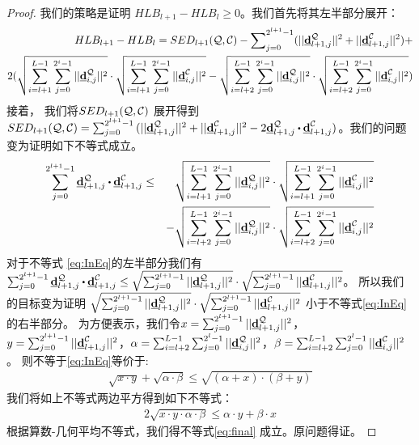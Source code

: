 \begin{proof}\label{proof:p2}
	我们的策略是证明 $HLB_{l+1}- HLB_{l}\ge 0$。我们首先将其左半部分展开：
	\begin{eqnarray}\label{eq:minus}
HLB_{l+1}- HLB_{l}= SED_{l+1}({\cal Q},{\cal C}) - \sum\nolimits_{j=0}^{2^{l+1}-1}(||\emph{{\textbf{d}}}_{l+1,j}^{\cal Q}||^2  + ||\emph{{\textbf{d}}}_{l+1,j}^{\cal C}||^2)+\nonumber\\
 2(\sqrt{\sum_{i=l+1}^{L -1}\sum_{j=0}^{2^i-1}||\emph{{\textbf{d}}}_{i,j}^{\cal Q}||^2} \cdot \sqrt{\sum_{i=l+1}^{L -1}\sum_{j=0}^{2^i-1}||\emph{{\textbf{d}}}_{i,j}^{\cal C}||^2} -\sqrt{\sum_{i=l+2}^{L -1}\sum_{j=0}^{2^i-1}||\emph{{\textbf{d}}}_{i,j}^{\cal Q}||^2} \cdot \sqrt{\sum_{i=l+2}^{L -1}\sum_{j=0}^{2^i-1}||\emph{{\textbf{d}}}_{i,j}^{\cal C}||^2})\nonumber
	\end{eqnarray}	
	接着， 我们将$SED_{l+1}({\cal Q},{\cal C})$ 展开得到$SED_{l+1}({\cal Q},{\cal C})=\sum_{j=0}^{2^{l+1}-1}{(||\vd_{l+1,j}^{\cal Q}||^2+||\vd_{l+1,j}^{\cal C}||^2}-2 \vd_{l+1,j}^{\cal Q} \bigcdot \vd_{l+1,j}^{\cal C})$。我们的问题变为证明如下不等式成立。
	\begin{eqnarray}\label{eq:InEq}
	\sum_{j=0}^{2^{l+1}-1}\vd_{l+1,j}^{\cal Q} \bigcdot \vd_{l+1,j}^{\cal C} &\le& \sqrt{\sum_{i=l+1}^{L-1}\sum_{j=0}^{2^i-1}||\vd_{i,j}^{\cal Q}||^2} \cdot \sqrt{\sum_{i=l+1}^{L-1}\sum_{j=0}^{2^i-1}||\vd_{i,j}^{\cal C}||^2} \nonumber\\
&\quad&	-	\sqrt{\sum_{i=l+2}^{L-1}\sum_{j=0}^{2^i-1}||\vd_{i,j}^{\cal Q}||^2} \cdot \sqrt{\sum_{i=l+2}^{L-1}\sum_{j=0}^{2^i-1}||\vd_{i,j}^{\cal C}||^2} 
	\end{eqnarray}	
	对于不等式 \ref{eq:InEq}的左半部分我们有
	$\sum_{j=0}^{2^{l+1}-1}\vd_{l+1,j}^{\cal Q}\bigcdot \vd_{l+1,j}^{\cal C} \le
	\sqrt{\sum_{j=0}^{2^{l+1}-1}||\vd_{l+1,j}^{\cal Q}||^2} \cdot \sqrt{\sum_{j=0}^{2^{l+1}-1}||\vd_{l+1,j}^{\cal C}||^2}$。
	所以我们的目标变为证明
	$\sqrt{\sum_{j=0}^{2^{l+1}-1}||\emph{{\textbf{d}}}_{l+1,j}^{\cal Q}||^2} \cdot \sqrt{\sum_{j=0}^{2^{l+1}-1}||\emph{{\textbf{d}}}_{l+1,j}^{\cal C}||^2}$
	小于不等式\ref{eq:InEq}的右半部分。
	为方便表示，我们令$x= \sum_{j=0}^{2^{l+1}-1}||\emph{{\textbf{d}}}_{l+1,j}^{\cal Q}||^2$，$y=\sum_{j=0}^{2^{l+1}-1}||\emph{{\textbf{d}}}_{l+1,j}^{\cal C}||^2$，$\alpha = \sum_{i=l+2}^{L-1}\sum_{j=0}^{2^l-1}||\emph{{\textbf{d}}}_{i,j}^{\cal Q}||^2$，$\beta =  \sum_{i=l+2}^{L-1}\sum_{j=0}^{2^l-1}||\emph{{\textbf{d}}}_{i,j}^{\cal C}||^2$。
	则不等于\ref{eq:InEq}等价于:
	\begin{eqnarray}\label{eq:sim}
	\sqrt{x \cdot y} + \sqrt{\alpha \cdot \beta} \le \sqrt{(\alpha+x) \cdot (\beta+y)}
	\end{eqnarray}	
	我们将如上不等式两边平方得到如下不等式：
	\begin{eqnarray}\label{eq:final}
	2\sqrt{x\cdot y \cdot \alpha \cdot \beta} \le \alpha \cdot y+\beta\cdot x
	\end{eqnarray}	
	根据算数-几何平均不等式，我们得不等式\ref{eq:final} 成立。原问题得证。
\end{proof}

